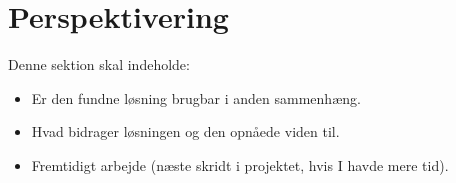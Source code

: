 \section{Perspektivering}
Denne sektion skal indeholde:

\begin{itemize}
    \item Er den fundne løsning brugbar i anden sammenhæng.
    \item Hvad bidrager løsningen og den opnåede viden til. 
    \item Fremtidigt arbejde (næste skridt i projektet, hvis I havde mere tid).
\end{itemize}{}